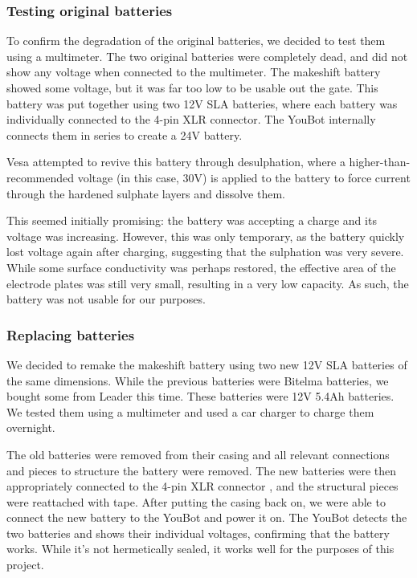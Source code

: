 \documentclass[a4paper, 12pt]{article}
\newif\ifshownotes
\newcommand{\notes}[1]{\ifshownotes\textcolor{blue}{#1}\fi}
\begin{document}
    \subsubsection{Testing original batteries}

    To confirm the degradation of the original batteries, we decided to test them using a multimeter. The two original batteries were completely dead, and did not show any voltage when connected to the multimeter. The makeshift battery showed some voltage, but it was far too low to be usable out the gate. This battery was put together using two 12V SLA batteries, where each battery was individually connected to the 4-pin XLR connector. The YouBot internally connects them in series to create a 24V battery.   
    
    Vesa attempted to revive this battery through desulphation, where a higher-than-recommended voltage (in this case, 30V) is applied to the battery to force current through the hardened sulphate layers and dissolve them. 

    This seemed initially promising: the battery was accepting a charge and its voltage was increasing. However, this was only temporary, as the battery quickly lost voltage again after charging, suggesting that the sulphation was very severe. While some surface conductivity was perhaps restored, the effective area of the electrode plates was still very small, resulting in a very low capacity. As such, the battery was not usable for our purposes.  

    \subsubsection{Replacing batteries}

    \notes{maybe here we can link to the specific batteries used? the dimensions would be neat as well...}

    We decided to remake the makeshift battery using two new 12V SLA batteries of the same dimensions. While the previous batteries were Bitelma batteries, we bought some from Leader this time. These batteries were 12V 5.4Ah batteries. We tested them using a multimeter and used a car charger to charge them overnight. 
    
    The old batteries were removed from their casing and all relevant connections and pieces to structure the battery were removed. The new batteries were then appropriately connected to the 4-pin XLR connector \notes{maybe mention the pinout here?}, and the structural pieces were reattached with tape. After putting the casing back on, we were able to connect the new battery to the YouBot and power it on. The YouBot detects the two batteries and shows their individual voltages, confirming that the battery works. While it's not hermetically sealed, it works well for the purposes of this project. 
\end{document}
